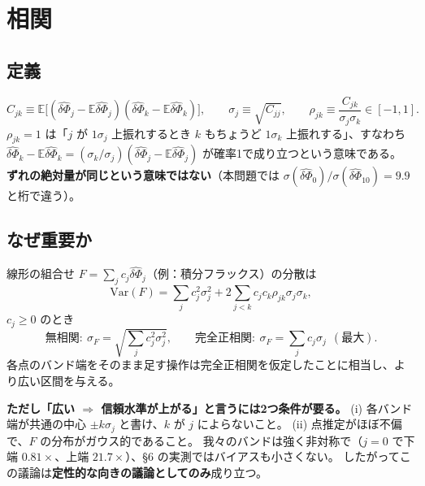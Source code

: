 \documentclass[11pt,a4paper]{ltjsarticle}
\newcommand{\dPh}{\widehat{\delta\Phi}}
\newcommand{\E}{\mathbb{E}}
\newcommand{\Var}{\mathrm{Var}}
\begin{document}
\section{相関}

\subsection{定義}
\begin{equation}
C_{jk}\equiv\E\big[(\dPh_j-\E\dPh_j)(\dPh_k-\E\dPh_k)\big],\qquad
\sigma_j\equiv\sqrt{C_{jj}},\qquad
\rho_{jk}\equiv\frac{C_{jk}}{\sigma_j\sigma_k}\in[-1,1].
\end{equation}
$\rho_{jk}=1$ は「$j$ が $1\sigma_j$ 上振れするとき $k$ もちょうど $1\sigma_k$ 上振れする」、すなわち
$\dPh_k-\E\dPh_k=(\sigma_k/\sigma_j)(\dPh_j-\E\dPh_j)$ が確率1で成り立つという意味である。
\textbf{ずれの絶対量が同じという意味ではない}（本問題では $\sigma(\dPh_0)/\sigma(\dPh_{10})=9.9$ と桁で違う）。

\subsection{なぜ重要か}
線形の組合せ $F=\sum_j c_j\dPh_j$（例：積分フラックス）の分散は
\begin{equation}
\Var(F)=\sum_j c_j^2\sigma_j^2+2\sum_{j<k}c_jc_k\rho_{jk}\sigma_j\sigma_k,
\end{equation}
$c_j\ge0$ のとき
\begin{equation}
\text{無相関}:\ \sigma_F=\sqrt{\textstyle\sum_j c_j^2\sigma_j^2},
\qquad
\text{完全正相関}:\ \sigma_F=\sum_j c_j\sigma_j\ \ (\text{最大}).
\end{equation}
各点のバンド端をそのまま足す操作は完全正相関を仮定したことに相当し、より広い区間を与える。

\textbf{ただし「広い $\Rightarrow$ 信頼水準が上がる」と言うには2つ条件が要る。}
(i) 各バンド端が共通の中心 $\pm k\sigma_j$ と書け、$k$ が $j$ によらないこと。
(ii) 点推定がほぼ不偏で、$F$ の分布がガウス的であること。
我々のバンドは強く非対称で（$j=0$ で下端 $0.81\times$、上端 $21.7\times$）、\S6 の実測ではバイアスも小さくない。
したがってこの議論は\textbf{定性的な向きの議論としてのみ}成り立つ。
\end{document}
